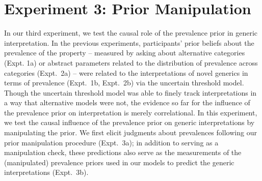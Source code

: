 \documentclass[floatsintext,doc]{apa6}
\begin{document}






\hypertarget{experiment-3-prior-manipulation}{%
\section{Experiment 3: Prior Manipulation}\label{experiment-3-prior-manipulation}}

In our third experiment, we test the causal role of the prevalence prior in generic interpretation.
In the previous experiments, participants' prior beliefs about the prevalence of the property -- measured by asking about alternative categories (Expt. 1a) or abstract parameters related to the distribution of prevalence across categories (Expt.~2a) -- were related to the interpretations of novel generics in terms of prevalence (Expt.~1b, Expt.~2b) via the uncertain threshold model.
Though the uncertain threshold model was able to finely track interpretations in a way that alternative models were not, the evidence so far for the influence of the prevalence prior on interpretation is merely correlational.
In this experiment, we test the causal influence of the prevalence prior on generic interpretations by manipulating the prior.
We first elicit judgments about prevalences following our prior manipulation procedure (Expt.~3a); in addition to serving as a manipulation check, these predictions also serve as the measurements of the (manipulated) prevalence priors used in our models to predict the generic interpretations (Expt.~3b).
\end{document}
